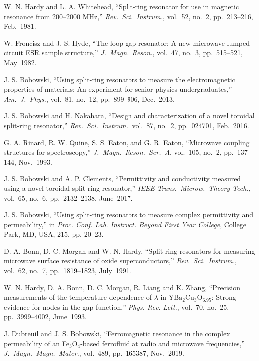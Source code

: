 \documentclass[conference]{IEEEtran}
\begin{document}
\begin{thebibliography}{00}

W. N. Hardy and L. A. Whitehead, ``Split-ring resonator for use in magnetic resonance from 200--2000 {MHz},'' {\it Rev.\ Sci.\ Instrum.}, vol.~52, no.~2, pp.~213--216, Feb.~1981.

W. Froncisz and J. S. Hyde, ``The loop-gap resonator: {A} new microwave lumped circuit {ESR} sample structure,'' {\it J.\ Magn.\ Reson.}, vol.~47, no.~3, pp.~515--521, May~1982.

J. S. Bobowski, ``Using split-ring resonators to measure the electromagnetic properties of materials: An experiment for senior physics undergraduates,'' {\it Am.\ J.\ Phys.}, vol.~81, no.~12, pp.~899--906, Dec.~2013.

J. S. Bobowski and H. Nakahara, ``Design and characterization of a novel toroidal split-ring resonator,'' {\it Rev.\ Sci.\ Instrum.}, vol.~87, no.~2, pp.~024701, Feb.~2016.

G. A. Rinard, R. W. Quine, S. S. Eaton, and G. R. Eaton, ``Microwave coupling structures for spectroscopy,'' {\it J.\ Magn.\ Reson.\ Ser.\ A}, vol.~105, no.~2, pp.~137--144, Nov.~1993.

J. S. Bobowski and A. P. Clements, ``Permittivity and conductivity measured using a novel toroidal split-ring resonator,'' {\it IEEE Trans.\ Microw.\ Theory Tech.}, vol.~65, no.~6, pp.~2132--2138, June~2017.

J. S. Bobowski, ``Using split-ring resonators to measure complex permittivity and permeability,'' in {\it Proc. Conf. Lab. Instruct. Beyond First Year College}, College Park, MD, USA, 215, pp. 20--23.

D. A. Bonn, D. C. Morgan and W. N. Hardy, ``Split‐ring resonators for measuring microwave surface resistance of oxide superconductors,''  {\it Rev.\ Sci.\ Instrum.}, vol.~62, no.~7, pp.~1819--1823, July~1991.

W. N. Hardy, D. A. Bonn, D. C. Morgan, R. Liang and K. Zhang, ``Precision measurements of the temperature dependence of \ensuremath{\lambda} in ${\mathrm{YBa}}_{2}$${\mathrm{Cu}}_{3}$${\mathrm{O}}_{6.95}$: Strong evidence for nodes in the gap function,'' {\it Phys. Rev. Lett.}, vol.~70, no.~25, pp.~3999--4002, June~1993.

J. Dubreuil and J. S. Bobowski, ``Ferromagnetic resonance in the complex permeability of an {Fe$_3$O$_4$}-based ferrofluid at radio and microwave frequencies,'' {\it J.\ Magn.\ Magn.\ Mater.}, vol.~489, pp.~165387, Nov.~2019.


\end{thebibliography}
\end{document}

